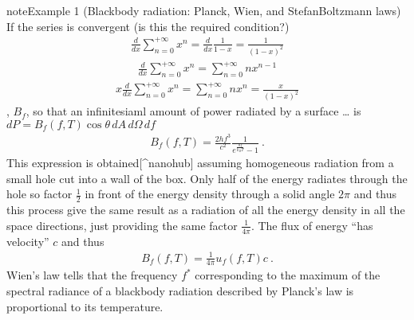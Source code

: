 \documentclass[letterpaper,10pt,english]{jupyterBook}
\begin{document}
\begin{sphinxadmonition}{note}{Example 1 (Black\sphinxhyphen{}body radiation: Planck, Wien, and Stefan\sphinxhyphen{}Boltzmann laws)}
\begin{equation*}
\end{equation*}
\sphinxAtStartPar
{} If the series is convergent (is this the required condition?)
\begin{equation*}
\begin{split}\frac{d}{d x} \sum_{n=0}^{+\infty} x^n = \frac{d}{dx} \frac{1}{1 - x} = \frac{1}{(1-x)^2}\end{split}
\end{equation*}\begin{equation*}
\begin{split}\frac{d}{d x} \sum_{n=0}^{+\infty} x^n = \sum_{n=0}^{+\infty} n x^{n-1}\end{split}
\end{equation*}\begin{equation*}
\begin{split}x \frac{d}{d x} \sum_{n=0}^{+\infty} x^n = \sum_{n=0}^{+\infty} n x^n = \frac{x}{(1-x)^2}\end{split}
\end{equation*}
\sphinxAtStartPar
{}, \(B_{f}\), so that an infinitesiaml amount of power radiated by a surface … is \(d P = B_f(f,T) \cos \theta \, dA \, d\Omega \, d f\)
\begin{equation*}
\begin{split}B_{f}(f, T) = \frac{2 h f^3}{c^2}\frac{1}{e^{\frac{hf}{k_B T}} - 1} \ .\end{split}
\end{equation*}
\sphinxAtStartPar
This expression is obtained{[}\textasciicircum{}nano\sphinxhyphen{}hub{]} assuming homogeneous radiation from a small hole cut into a wall of the box. Only half of the energy radiates through the hole \sphinxhyphen{} so factor \(\frac{1}{2}\) in front of the energy density \sphinxhyphen{} through a solid angle \(2 \pi\) \sphinxhyphen{} and thus this process give the same result as a radiation of all the energy density in all the space directions, just providing the same factor \(\frac{1}{4 \pi}\). The flux of energy “has velocity” \(c\) and thus
\begin{equation*}
\begin{split}B_{f}(f, T) = \frac{1}{4 \pi} u_{f}(f,T) c \ .\end{split}
\end{equation*}
\sphinxAtStartPar
{} Wien’s law tells that the frequency \(f^*\) corresponding to the maximum of the spectral radiance of a black\sphinxhyphen{}body radiation described by Planck’s law is proportional to its temperature.


\end{sphinxadmonition}
\end{document}
